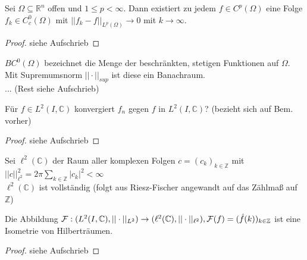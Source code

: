   \begin{theorem}
    Sei $\Omega \subseteq \mathbb{R}^n$ offen und $1 \leq p < \infty$. Dann existiert zu jedem $f \in C^p(\Omega)$ eine Folge $f_k \in C_c^0(\Omega)$ mit $|| f_k - f||_{L^p(\Omega)} \to 0$ mit $k \to \infty$.
  \end{theorem}
  \begin{proof}
    siehe Aufschrieb
  \end{proof}

  \begin{remark}
    $BC^0(\Omega)$ bezeichnet die Menge der beschränkten, stetigen Funktionen auf $\Omega$. Mit Supremumsnorm $||\cdot||_{sup}$ ist diese ein Banachraum.\\
    ... (Rest siehe Aufschrieb)
  \end{remark}

  \begin{theorem}
    Für $f \in L^2(I, \mathbb{C})$ konvergiert $f_n$ gegen $f$ in $L^2(I, \mathbb{C})$? (bezieht sich auf Bem. vorher)
  \end{theorem}
  \begin{proof}
    siehe Aufschrieb
  \end{proof}

  \begin{remark}
    Sei $\ell^2(\mathbb{C})$ der Raum aller komplexen Folgen $c = (c_k)_{k \in \mathbb{Z}}$ mit $||c||_{\ell^2}^2 = 2 \pi \sum\limits_{k \in \mathbb{Z}} |c_k|^2 < \infty$\\
    $\ell^2(\mathbb{C})$ ist vollständig (folgt aus Riesz-Fischer angewandt auf das Zählmaß auf $\mathbb{Z}$)
  \end{remark}

  \newpage
  \begin{lemma}
    Die Abbildung $\mathcal{F}: (L^2(I, \mathbb{C}), ||\cdot||_{L^2}) \to (\ell^2(\mathbb{C}), ||\cdot||_{\ell^2}), \mathcal{F}(f) = (\hat{f}(k))_{k \in \mathbb{Z}}$ ist eine Isometrie von Hilberträumen.
  \end{lemma}
  \begin{proof}
    siehe Aufschrieb
  \end{proof}

